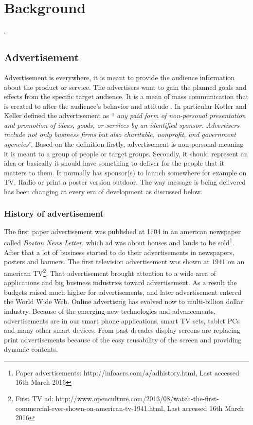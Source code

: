 
\chapter{Background} %

\label{Chapter2} %
\newpage
.
\newpage

\section{Advertisement}
Advertisement is everywhere, it is meant to provide the audience information about the product or service. The advertisers want to gain the planned goals and effects from the specific target audience. It is a mean of mass communication that is created to alter the audience’s behavior and attitude \cite{advertisementdef}. In particular Kotler and Keller \cite{ad_def} defined the advertisement as ``\emph{ any paid form of non-personal presentation and promotion of ideas, goods, or services by an identified sponsor. Advertisers include not only business firms but also charitable, nonprofit, and government agencies}''. Based on the definition firstly, advertisement is non-personal meaning it is meant to a group of people or target groups. Secondly, it should represent an idea or basically it should have something to deliver for the people that it matters to them. It normally has sponsor(s) to launch somewhere for example on TV, Radio or print a poster version outdoor. The way message is being delivered has been changing at every era of development as discussed below.



\subsection{History of advertisement}
The first paper advertisement was published at 1704 in an american newspaper called \emph{Boston News Letter}, which ad was about houses and lands to be sold\footnote{Paper advertisements: http://infoacrs.com/a/adhistory.html, Last accessed 16th March 2016}. After that a lot of business started to do their advertisements in newspapers, posters and banners. The first television advertisement was shown at 1941 on an american TV\footnote {First TV ad: http://www.openculture.com/2013/08/watch-the-first-commercial-ever-shown-on-american-tv-1941.html, Last accessed 16th March 2016}. That advertisement brought attention to a wide area of applications and big business industries toward advertisement. As a result the budgets raised much higher for advertisements, and later advertisement entered the World Wide Web. Online advertising has evolved now to multi-billion dollar industry. Because of the emerging new technologies and advancements, advertisements are in our smart phone applications, smart TV sets, tablet PCs and many other smart devices. From past decades display screens are replacing print advertisements because of the easy reusability of the screen and providing dynamic contents.

